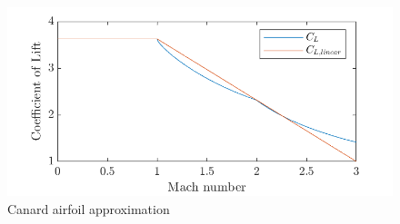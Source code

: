 \begin{figure}[ht]
    \centering
    \includegraphics[width=0.5\linewidth]{images-design/airfoil_angles_linear.png}
    \caption[Canard airfoil approximation]{Canard airfoil approximation}
    \label{fig:jacobian-canard-airfoil}
\end{figure}

